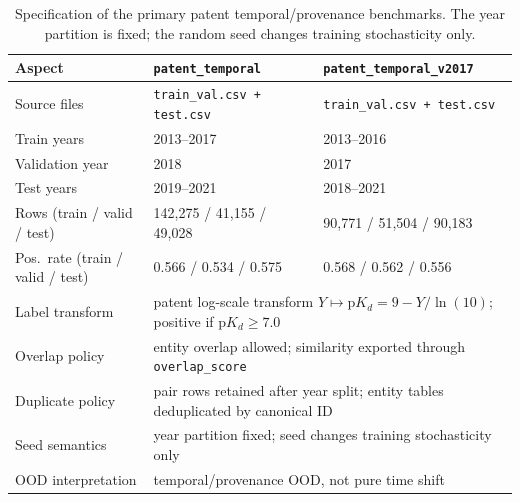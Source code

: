 \documentclass[referee,pdflatex,sn-basic,Numbered]{sn-jnl}
\begin{document}
\begin{appendices}
\begin{table}[t]
  \centering
  \scriptsize
  \caption{Specification of the primary patent temporal/provenance benchmarks. The year partition is fixed; the random seed changes training stochasticity only.}
  \label{tab:patent-spec}
  \setlength{\tabcolsep}{3.5pt}
  \begin{tabular*}{\textwidth}{@{\extracolsep{\fill}}lp{}p{}@{}}
    \toprule
    Aspect & \texttt{patent\_temporal} & \texttt{patent\_temporal\_v2017} \\
    \midrule
    Source files & \texttt{train\_val.csv + test.csv} & \texttt{train\_val.csv + test.csv} \\
    Train years & 2013--2017 & 2013--2016 \\
    Validation year & 2018 & 2017 \\
    Test years & 2019--2021 & 2018--2021 \\
    Rows (train / valid / test) & 142,275 / 41,155 / 49,028 & 90,771 / 51,504 / 90,183 \\
    Pos.\ rate (train / valid / test) & 0.566 / 0.534 / 0.575 & 0.568 / 0.562 / 0.556 \\
    Label transform & \multicolumn{2}{l}{patent log-scale transform $Y \mapsto \mathrm{p}K_d = 9 - Y / \ln(10)$; positive if $\mathrm{p}K_d \ge 7.0$} \\
    Overlap policy & \multicolumn{2}{l}{entity overlap allowed; similarity exported through \texttt{overlap\_score}} \\
    Duplicate policy & \multicolumn{2}{l}{pair rows retained after year split; entity tables deduplicated by canonical ID} \\
    Seed semantics & \multicolumn{2}{l}{year partition fixed; seed changes training stochasticity only} \\
    OOD interpretation & \multicolumn{2}{l}{temporal/provenance OOD, not pure time shift} \\
    \bottomrule
  \end{tabular*}
\end{table}


\end{appendices}
\end{document}
